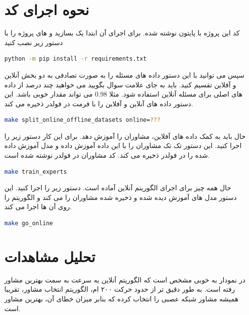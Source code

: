 \documentclass{article}
\begin{document}
\section{نحوه اجرای کد}
کد این پروژه با پایتون نوشته شده. برای اجرای آن ابتدا یک 
بسازید و 
های پروژه را با دستور زیر نصب کنید

\begin{latin}
\begin{lstlisting}[language=bash]
python -m pip install -r requirements.txt
\end{lstlisting}
\end{latin}

سپس می توانید با این دستور داده های مسئله را به صورت تصادفی به دو بخش آنلاین و آفلاین تقسیم کنید. باید به جای علامت سوال بگویید می خواهید چند درصد از داده های اصلی برای مسئله آنلاین استفاده شود. مثلا 0.98 می تواند مقدار خوبی باشد. این دستور داده های آنلاین و آفلاین را با فرمت 
در فولدر 
ذخیره می کند.

\begin{latin}
\begin{lstlisting}[language=bash]
make split_online_offline_datasets online=???
\end{lstlisting}
\end{latin}

حال باید به کمک داده های آفلاین، مشاوران را آموزش دهد. برای این کار دستور زیر را اجرا کنید. این دستور تک تک مشاوران را با این داده آموزش داده و مدل آموزش داده شده را در فولدر 
ذخیره می کند. کد مشاوران در فولدر 
نوشته شده است.

\begin{latin}
\begin{lstlisting}[language=bash]
make train_experts
\end{lstlisting}
\end{latin}

حال همه چیز برای اجرای الگوریتم آنلاین آماده است. دستور زیر را اجرا کنید. این دستور مدل های آموزش دیده شده و ذخیره شده مشاوران را 
می کند و الگوریتم 
را روی آن ها اجرا می کند.

\begin{latin}
\begin{lstlisting}[language=bash]
make go_online
\end{lstlisting}
\end{latin}

\section{تحلیل مشاهدات}
در نمودار به خوبی مشخص است که الگوریتم آنلاین به سرعت به سمت بهترین مشاور رفته است. به طور دقیق تر از حدود حرکت ۲۰۰ ام، الگوریتم انتخاب مشاور، تقریبا همیشه مشاور شبکه عصبی را انتخاب کرده که بنابر میزان خطای آن، بهترین مشاور است.
\end{document}
